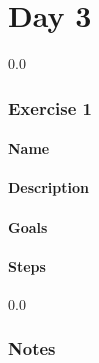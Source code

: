 \part{Day 3}
{\setlength{\baselineskip}%
  {0.0\baselineskip}
  \section*{\flushright Exercise 1}
  \hrulefill \par}
\subsection{Name}

\subsection{Description}

\subsection{Goals}

\subsection{Steps}

\newpage
{\setlength{\baselineskip}%
  {0.0\baselineskip}
  \section*{Notes}
  \hrulefill \par}